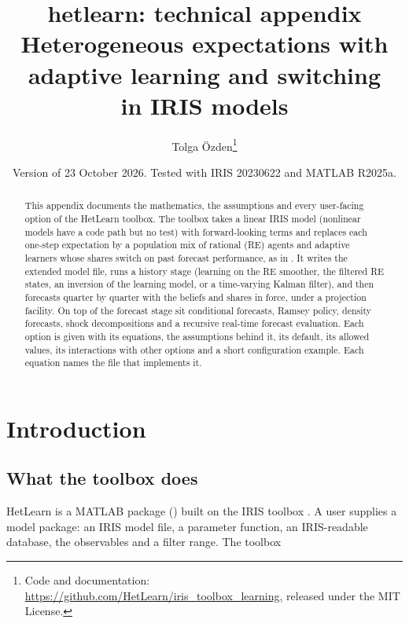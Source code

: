 \documentclass[11pt,a4paper]{article}
\title{\textbf{hetlearn: technical appendix}\\[4pt]
\large Heterogeneous expectations with adaptive learning and switching\\ in IRIS models}
\author{Tolga \"Ozden\thanks{Code and documentation:
  \url{https://github.com/HetLearn/iris_toolbox_learning}, released under the MIT License.}}
\date{Version of 23 October 2026. Tested with IRIS 20230622 and MATLAB R2025a.}
\begin{document}
\maketitle

\begin{abstract}
\noindent
This appendix documents the mathematics, the assumptions and every user-facing option of the
HetLearn toolbox. The toolbox takes a linear IRIS model (nonlinear models have a code path but
no test) with forward-looking terms and replaces each one-step expectation by a population mix of rational
(RE) agents and adaptive learners whose shares switch on past forecast performance, as in
\citet{ozden2025}. It writes the extended model file, runs a history stage (learning on the RE
smoother, the filtered RE states, an inversion of the learning model, or a time-varying Kalman
filter), and then forecasts quarter by quarter with the beliefs and shares in force, under a
projection facility. On top of the forecast stage sit conditional forecasts, Ramsey policy,
density forecasts, shock decompositions and a recursive real-time forecast evaluation. Each
option is given with its equations, the assumptions behind it, its default, its allowed values,
its interactions with other options and a short configuration example. Each equation names the
file that implements it.
\end{abstract}

\tableofcontents
\clearpage

\section{Introduction}\label{sec:intro}

\subsection{What the toolbox does}

HetLearn is a MATLAB package () built on the IRIS toolbox
\citep{iris}. A user supplies a model package: an IRIS model file, a parameter function, an
IRIS-readable database, the observables and a filter range. The toolbox
\end{document}
